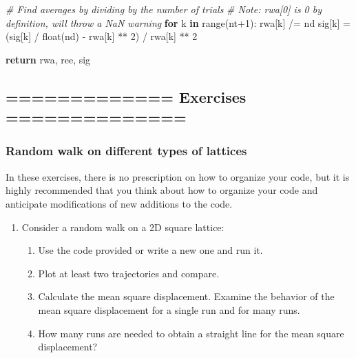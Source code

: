 \documentclass[11pt]{article}
\providecommand{\tightlist}{%
      \setlength{\itemsep}{0pt}\setlength{\parskip}{0pt}}
\newenvironment{Shaded}{}{}
\newcommand{\KeywordTok}[1]{\textcolor[rgb]{0.00,0.44,0.13}{\textbf{{#1}}}}
\newcommand{\DecValTok}[1]{\textcolor[rgb]{0.25,0.63,0.44}{{#1}}}
\newcommand{\CommentTok}[1]{\textcolor[rgb]{0.38,0.63,0.69}{\textit{{#1}}}}
\newcommand{\NormalTok}[1]{{#1}}
\newcommand{\ControlFlowTok}[1]{\textcolor[rgb]{0.00,0.44,0.13}{\textbf{{#1}}}}
\newcommand{\OperatorTok}[1]{\textcolor[rgb]{0.40,0.40,0.40}{{#1}}}
\newcommand{\BuiltInTok}[1]{{#1}}
\begin{document}
\begin{Shaded}
\begin{Highlighting}[]
    \CommentTok{\# Find averages by dividing by the number of trials}
    \CommentTok{\# Note: rwa[0] is 0 by definition, will throw a NaN warning }
    \ControlFlowTok{for}\NormalTok{ k }\KeywordTok{in} \BuiltInTok{range}\NormalTok{(nt}\OperatorTok{+}\DecValTok{1}\NormalTok{):}
\NormalTok{        rwa[k] }\OperatorTok{/=}\NormalTok{ nd}
\NormalTok{        sig[k] }\OperatorTok{=}\NormalTok{ (sig[k] }\OperatorTok{/} \BuiltInTok{float}\NormalTok{(nd) }\OperatorTok{{-}}\NormalTok{ rwa[k] }\OperatorTok{**} \DecValTok{2}\NormalTok{) }\OperatorTok{/}\NormalTok{ rwa[k] }\OperatorTok{**} \DecValTok{2}

    \ControlFlowTok{return}\NormalTok{ rwa, ree, sig}
\end{Highlighting}
\end{Shaded}

    \hypertarget{exercises}{%
\subsection{============= Exercises ==============}\label{exercises}}

    \hypertarget{random-walk-on-different-types-of-lattices}{%
\subsubsection{Random walk on different types of
lattices}\label{random-walk-on-different-types-of-lattices}}

In these exercises, there is no prescription on how to organize your
code, but it is highly recommended that you think about how to organize
your code and anticipate modifications of new additions to the code.

\begin{enumerate}
\def\labelenumi{\arabic{enumi}.}
\tightlist
\item
  Consider a random walk on a 2D square lattice:\\

  \begin{enumerate}
  \def\labelenumii{\alph{enumii}.}
  \tightlist
  \item
    Use the code provided or write a new one and run it.\\
  \item
    Plot at least two trajectories and compare.\\
  \item
    Calculate the mean square displacement. Examine the behavior of the
    mean square displacement for a single run and for many runs.\\
  \item
    How many runs are needed to obtain a straight line for the mean
    square displacement?
  \end{enumerate}
\end{enumerate}
\end{document}
